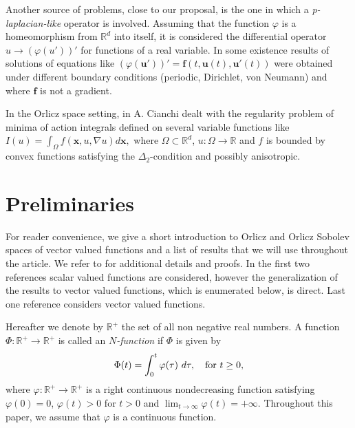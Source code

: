 \documentclass[twoside]{article}
\theoremstyle{remark}
\renewcommand{\b}[1]{\boldsymbol{#1}}
\newcommand{\rr}{\mathbb{R}}
\begin{document}
Another source of problems, close to our proposal, is the one in which a \emph {p-laplacian-like} operator is involved.
Assuming that the function $\varphi$ is a homeomorphism  from $\rr^d$ into itself, it is considered the differential operator
$u \to (\varphi(u'))'$ for functions of a real variable. 
In  \cite{Cristia-2011,C-2007,C-2009, 
Cristia-2008, 
m-1999, GHMS, GHMZ, manasevich2000boundary, manasevich1998periodic,} 
some existence results of solutions of equations 
like 
$(\varphi({\b u}'))'={\b f}(t,{\b u}(t),{\b u}'(t))$ were obtained 
under different boundary conditions (periodic, Dirichlet, von Neumann) 
and where $\b f$ is not a gradient.
%

In the Orlicz space setting,   in \cite{cianchi1999gradient,cianchi2000local} 
A. Cianchi dealt with
the regularity  problem of minima of action integrals defined on several variable functions like
$I(u)=\int_{\Omega}f(\b{x},u,\nabla u)d\b{x},$
where $\Omega\subset\mathbb{R}^d$, $u:\Omega\to\mathbb{R}$ and $f$ is bounded by convex 
functions satisfying the $\Delta_2$-condition and possibly anisotropic.













\section{Preliminaries}

For reader convenience, we give a short introduction to Orlicz and Orlicz Sobolev spaces of vector valued functions and a  list  of results that we will use throughout the article. We refer to \cite{adams_sobolev,KR,wroblewska2012application} for additional details and proofs. In the first two references scalar valued functions are considered, however the generalization of the results  to vector valued functions, which is enumerated below, is direct. Last one reference considers vector valued functions.

Hereafter we denote  by $\mathbb{R}^+$  the set of all non negative real numbers. A function $\Phi:\mathbb{R}^+\to \mathbb{R}^+ $ is called an \emph{$N$-function} if $\Phi$ is given by 
\[
\Phi(t)=\int_{0}^t \varphi(\tau)\ d\tau,\quad\hbox{for } t\geq 0,
\]
where $\varphi:\mathbb{R}^+\rightarrow \mathbb{R}^+$ is a right continuous nondecreasing function  satisfying   $\varphi(0)=0$, $\varphi(t)>0$ for $t>0$ and
$\lim_{t\rightarrow \infty}\varphi(t)=+\infty$.
{\color{red} Throughout this paper, we assume that $\varphi$ is a continuous function.} 
\end{document}
